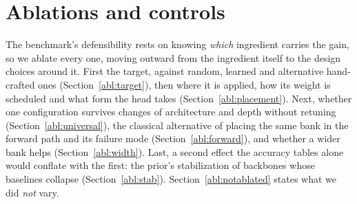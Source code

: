 \section{Ablations and controls}\label{sec:ablations}

 The benchmark's defensibility rests on knowing \emph{which} ingredient carries
the gain, so we ablate every one, moving outward from the ingredient itself to
the design choices around it. First the target, against random, learned and
alternative hand-crafted ones (Section~\ref{abl:target}), then where it is
applied, how its weight is scheduled and what form the head takes
(Section~\ref{abl:placement}). Next, whether one configuration survives changes
of architecture and depth without retuning (Section~\ref{abl:universal}), the
classical alternative of placing the same bank in the forward path and its
failure mode (Section~\ref{abl:forward}), and whether a wider bank helps
(Section~\ref{abl:width}). Last, a second effect the accuracy tables alone
would conflate with the first: the prior's stabilization of backbones whose
baselines collapse (Section~\ref{abl:stab}). Section~\ref{abl:notablated}
states what we did \emph{not} vary.

